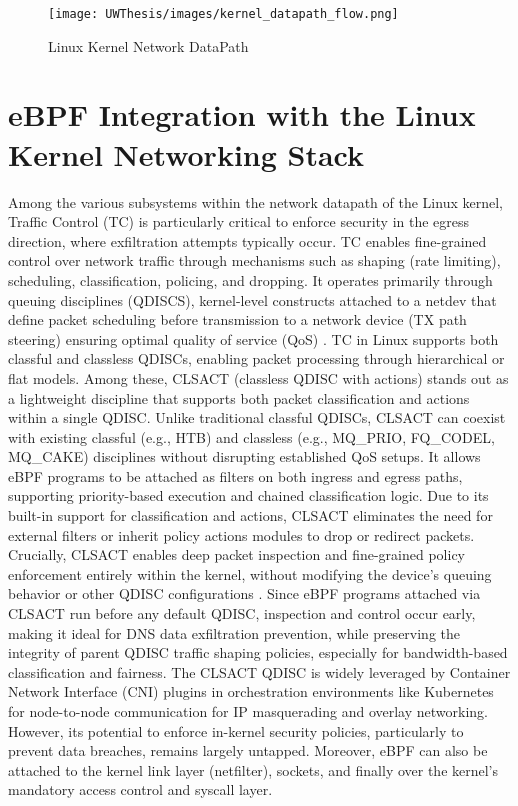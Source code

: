\documentclass [11pt, proquest] {uwthesis}[2020/02/24]
\begin{document}
\label{sec:kernel-network-datapath}
\begin{figure}[h]
\texttt{[image: UWThesis/images/kernel\_datapath\_flow.png]}
\caption{Linux Kernel Network DataPath}
\end{figure}



\section{eBPF Integration with the Linux Kernel Networking Stack}
Among the various subsystems within the network datapath of the Linux kernel, Traffic Control (TC) is particularly critical to enforce security in the egress direction, where exfiltration attempts typically occur. TC enables fine-grained control over network traffic through mechanisms such as shaping (rate limiting), scheduling, classification, policing, and dropping. It operates primarily through queuing disciplines (QDISCS), kernel-level constructs attached to a netdev that define packet scheduling before transmission to a network device (TX path steering) ensuring optimal quality of service (QoS) \cite{salim2015linux} .
TC in Linux supports both classful and classless QDISCs, enabling packet processing through hierarchical or flat models. Among these, CLSACT (classless QDISC with actions) stands out as a lightweight discipline that supports both packet classification and actions within a single QDISC. Unlike traditional classful QDISCs, CLSACT can coexist with existing classful (e.g., HTB) and classless (e.g., MQ\_PRIO, FQ\_CODEL, MQ\_CAKE) disciplines without disrupting established QoS setups. It allows eBPF programs to be attached as filters on both ingress and egress paths, supporting priority-based execution and chained classification logic. Due to its built-in support for classification and actions, CLSACT eliminates the need for external filters or inherit policy actions modules to drop or redirect packets. Crucially, CLSACT enables deep packet inspection and fine-grained policy enforcement entirely within the kernel, without modifying the device’s queuing behavior or other QDISC configurations \cite{borkmann2016getting}. Since eBPF programs attached via CLSACT run before any default QDISC, inspection and control occur early, making it ideal for DNS data exfiltration prevention, while preserving the integrity of parent QDISC traffic shaping policies, especially for bandwidth-based classification and fairness. The CLSACT QDISC is widely leveraged by Container Network Interface (CNI) plugins in orchestration environments like Kubernetes for node-to-node communication for IP masquerading and overlay networking. However, its potential to enforce in-kernel security policies, particularly to prevent data breaches, remains largely untapped. Moreover, eBPF can also be attached to the kernel link layer (netfilter), sockets, and finally over the kernel's mandatory access control and syscall layer. 
\end{document}
